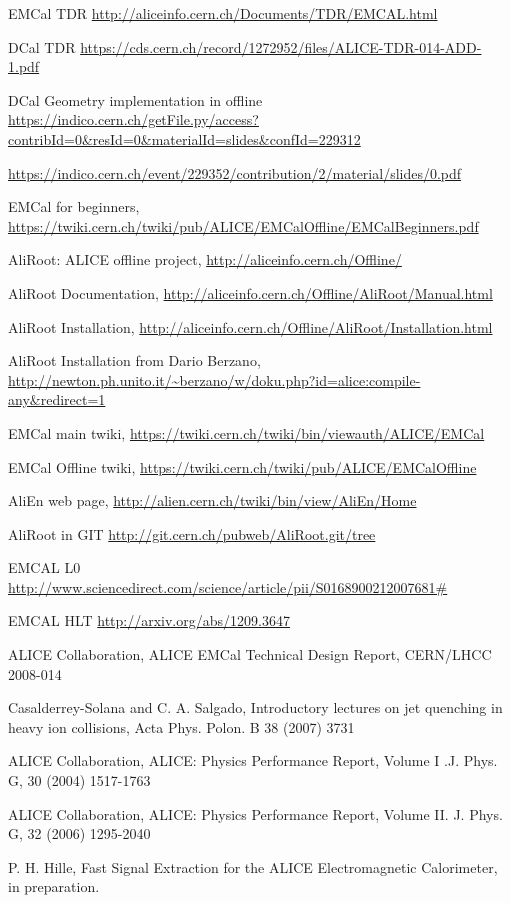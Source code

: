 \begin{thebibliography}{9}

EMCal TDR
\url{http://aliceinfo.cern.ch/Documents/TDR/EMCAL.html}

DCal TDR
\url{https://cds.cern.ch/record/1272952/files/ALICE-TDR-014-ADD-1.pdf}

DCal Geometry implementation in offline
\url{https://indico.cern.ch/getFile.py/access?contribId=0&resId=0&materialId=slides&confId=229312}

\url{https://indico.cern.ch/event/229352/contribution/2/material/slides/0.pdf}

EMCal for beginners,
\url{ https://twiki.cern.ch/twiki/pub/ALICE/EMCalOffline/EMCalBeginners.pdf} 

AliRoot: ALICE offline project,
\url{http://aliceinfo.cern.ch/Offline/}

AliRoot Documentation,
 \url{ http://aliceinfo.cern.ch/Offline/AliRoot/Manual.html} 
 
AliRoot Installation,
\url{ http://aliceinfo.cern.ch/Offline/AliRoot/Installation.html} 

AliRoot Installation from Dario Berzano,
\url{ http://newton.ph.unito.it/~berzano/w/doku.php?id=alice:compile-any&redirect=1} 

EMCal main twiki,
\url{ https://twiki.cern.ch/twiki/bin/viewauth/ALICE/EMCal} 

EMCal Offline twiki,
\url{ https://twiki.cern.ch/twiki/pub/ALICE/EMCalOffline} 

{AliEn web page},
 \url{ http://alien.cern.ch/twiki/bin/view/AliEn/Home}

AliRoot in GIT
\url{ http://git.cern.ch/pubweb/AliRoot.git/tree}


EMCAL L0
\url{http://www.sciencedirect.com/science/article/pii/S0168900212007681#}

EMCAL HLT
\url{http://arxiv.org/abs/1209.3647}

ALICE Collaboration, ALICE EMCal Technical Design Report, CERN/LHCC 2008-014

Casalderrey-Solana and C. A. Salgado, Introductory lectures on jet quenching in heavy ion collisions, Acta Phys. Polon. B 38 (2007) 3731

ALICE Collaboration, ALICE: Physics Performance Report, Volume I .J. Phys. G, 30 (2004) 1517-1763

ALICE Collaboration, ALICE: Physics Performance Report, Volume II. J. Phys. G, 32 (2006) 1295-2040

P. H. Hille, Fast Signal Extraction for the ALICE Electromagnetic Calorimeter, in preparation. 


\end{thebibliography}
